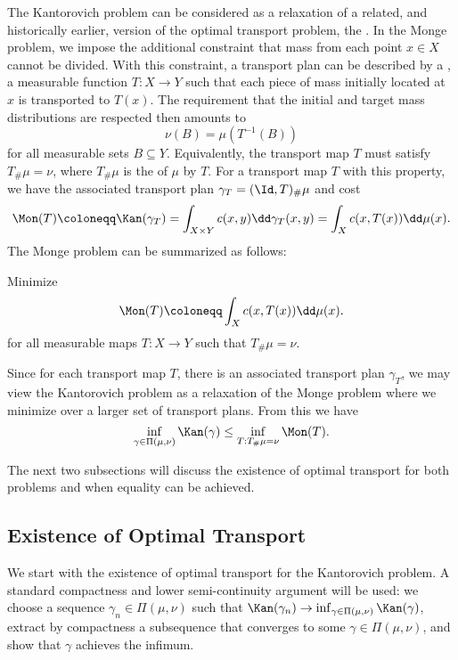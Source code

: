 \documentclass[oneside,reqno,letterpaper]{amsart}
\begin{document}
The Kantorovich problem can be considered as a relaxation of a related, and historically earlier, version of the optimal transport problem, the .
In the Monge problem, we impose the additional constraint that mass from each point \(x \in X\) cannot be divided.
With this constraint, a transport plan can be described by a , a measurable function \(T: X \to Y\) such that each piece of mass initially located at \(x\) is transported to \(T(x)\).
The requirement that the initial and target mass distributions are respected then amounts to
\[
  \nu(B) = \mu(T^{-1}(B))
\]
for all measurable sets \(B \subseteq Y\).
Equivalently, the transport map \(T\) must satisfy \(T_\# \mu = \nu\), where \(T_\# \mu\) is the  of \(\mu\) by \(T\).
For a transport map \(T\) with this property, we have the associated transport plan \(\gamma_T = (\Id, T)_\# \mu\) and cost
\[
  \Mon(T)
  \coloneqq \Kan(\gamma_T)
  = \int_{X \times Y} c(x, y) \dd \gamma_T(x, y)
  = \int_{X} c(x, T(x)) \dd \mu(x).
\]
The Monge problem can be summarized as follows:
\begin{problem*}[Monge]
  Minimize
  \[
    \Mon(T)
    \coloneqq \int_{X} c(x, T(x)) \dd \mu(x).
  \]
  for all measurable maps \(T: X \to Y\) such that \(T_\# \mu = \nu\).
\end{problem*}


Since for each transport map \(T\), there is an associated transport plan \(\gamma_T\), we may view the Kantorovich problem as a relaxation of the Monge problem where we minimize over a larger set of transport plans.
From this we have
\[
  \inf_{\gamma \in \Pi(\mu, \nu)} \Kan(\gamma)
  \leq \inf_{T: T_\# \mu = \nu} \Mon(T).
\]

The next two subsections will discuss the existence of optimal transport for both problems and when equality can be achieved.


\subsection{Existence of Optimal Transport}
We start with the existence of optimal transport for the Kantorovich problem.
A standard compactness and lower semi-continuity argument will be used:
we choose a sequence \(\gamma_n \in \Pi(\mu, \nu)\) such that \(\Kan(\gamma_n) \to \inf_{\gamma \in \Pi(\mu, \nu)} \Kan(\gamma)\), extract by compactness a subsequence that converges to some \(\gamma \in \Pi(\mu, \nu)\), and show that \(\gamma\) achieves the infimum.
\end{document}
